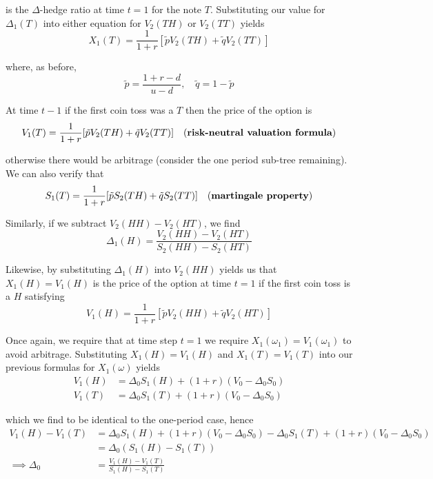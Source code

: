 \documentclass[12pt]{article}
\newlength\tindent
\renewcommand{\indent}{\hspace*{\tindent}}
\begin{document}
is the $\Delta$-hedge ratio at time $t = 1$ for the note $T$. Substituting our value for $\Delta_1(T)$ into either equation for $V_2(TH)$ or $V_2(TT)$ yields
\begin{equation*}
	X_1(T) = \frac{1}{1 + r}[\tilde{p}V_2(TH) + \tilde{q}V_2(TT)]
\end{equation*}

where, as before,
\begin{equation*}
	\tilde{p} = \frac{1 + r - d}{u - d}, \quad \tilde{q} = 1 - \tilde{p}
\end{equation*}

At time $t - 1$ if the first coin toss was a $T$ then the price of the option is
\begin{equation*}
	V_1(T) = \frac{1}{1 + r}[\tilde{p}V_2(TH) + \tilde{q}V_2(TT)] \quad \text{({\bf risk-neutral valuation formula})}
\end{equation*}

otherwise there would be arbitrage (consider the one period sub-tree remaining). We can also verify that
\begin{equation*}
	S_1(T) = \frac{1}{1 + r}[\tilde{p}S_2(TH) + \tilde{q}S_2(TT)] \quad \text{({\bf martingale property})}
\end{equation*}

Similarly, if we subtract $V_2(HH) - V_2(HT)$, we find
\begin{equation*}
	\Delta_1(H) = \frac{V_2(HH) - V_2(HT)}{S_2(HH) - S_2(HT)}
\end{equation*}

\indent Likewise, by substituting $\Delta_1(H)$ into $V_2(HH)$ yields us that $X_1(H) = V_1(H)$ is the price of the option at time $t = 1$ if the first coin toss is a $H$ satisfying
\begin{equation*}
	V_1(H) = \frac{1}{1 + r}[\tilde{p}V_2(HH) + \tilde{q}V_2(HT)]
\end{equation*}

\indent Once again, we require that at time step $t = 1$ we require $X_1(\omega_1) = V_1(\omega_1)$ to avoid arbitrage. Substituting $X_1(H) = V_1(H)$ and $X_1(T) = V_1(T)$ into our previous formulas for $X_1(\omega)$ yields
\begin{align*}
	V_1(H) &= \Delta_0S_1(H) + (1 + r)(V_0 - \Delta_0S_0) \\
	V_1(T) &= \Delta_0S_1(T) + (1 + r)(V_0 - \Delta_0S_0)
\end{align*}

which we find to be identical to the one-period case, hence
\begin{align*}
	V_1(H) - V_1(T) &=  \Delta_0S_1(H) + (1 + r)(V_0 - \Delta_0S_0) - \Delta_0S_1(T) + (1 + r)(V_0 - \Delta_0S_0) \\
	&= \Delta_0(S_1(H) - S_1(T)) \\
	\implies \Delta_0 &= \frac{V_1(H) - V_1(T)}{S_1(H) - S_1(T)}
\end{align*}
\end{document}
